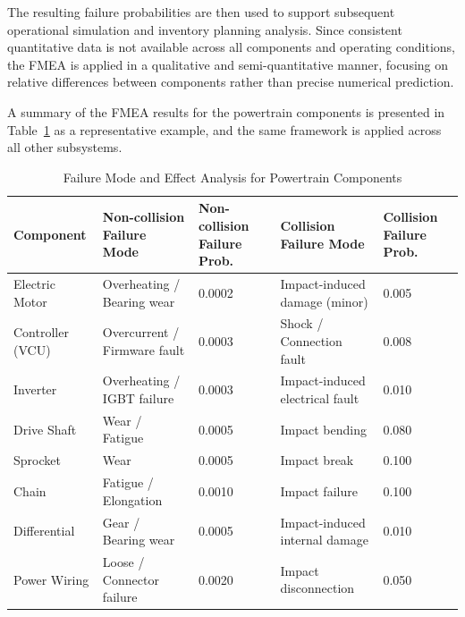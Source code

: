 \documentclass[11pt, a4paper]{report}
\numberwithin{equation}{section}
\begin{document}
\begin{refsection}
The resulting failure probabilities are then used to support subsequent operational simulation and inventory planning analysis. Since consistent quantitative data is not available across all components and operating conditions, the FMEA is applied in a qualitative and semi-quantitative manner, focusing on relative differences between components rather than precise numerical prediction.

A summary of the FMEA results for the powertrain components is presented in Table~\ref{tab:fmea} as a representative example, and the same framework is applied across all other subsystems.

\begin{table}[H]
\centering
\small
\renewcommand{\arraystretch}{1}

\caption{Failure Mode and Effect Analysis for Powertrain Components}
\label{tab:fmea}

\begin{tabularx}{\textwidth}{
l
X
p{}
X
p{}
}
\toprule

Component &
Non-collision Failure Mode &
Non-collision Failure Prob. &
Collision Failure Mode &
Collision Failure Prob. \\

\midrule

Electric Motor &
Overheating / Bearing wear &
0.0002 &
Impact-induced damage (minor) &
0.005 \\

Controller (VCU) &
Overcurrent / Firmware fault &
0.0003 &
Shock / Connection fault &
0.008 \\

Inverter &
Overheating / IGBT failure &
0.0003 &
Impact-induced electrical fault &
0.010 \\

Drive Shaft &
Wear / Fatigue &
0.0005 &
Impact bending &
0.080 \\

Sprocket &
Wear &
0.0005 &
Impact break &
0.100 \\

Chain &
Fatigue / Elongation &
0.0010 &
Impact failure &
0.100 \\

Differential &
Gear / Bearing wear &
0.0005 &
Impact-induced internal damage &
0.010 \\

Power Wiring &
Loose / Connector failure &
0.0020 &
Impact disconnection &
0.050 \\


\end{tabularx}
\end{table}
\end{refsection}
\end{document}
